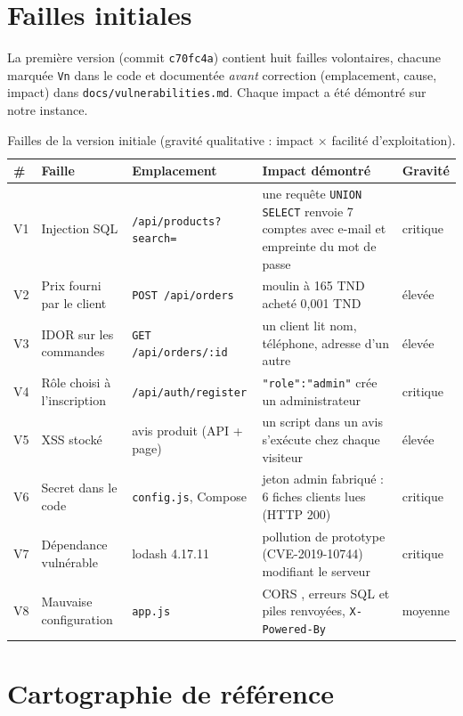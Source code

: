 \documentclass[11pt,a4paper]{article}
\newcommand{\code}[1]{\texttt{\small #1}}
\begin{document}
\section{Failles initiales}

La première version (commit \code{c70fc4a}) contient huit failles volontaires, chacune marquée \code{Vn}
dans le code et documentée \emph{avant} correction (emplacement, cause, impact) dans
\code{docs/vulnerabilities.md}. Chaque impact a été démontré sur notre instance.

\begin{table}[H]
\small
\begin{tabularx}{\linewidth}{@{}L{0.6cm}L{3.2cm}L{3.7cm}YL{1.3cm}@{}}
\toprule
\textbf{\#} & \textbf{Faille} & \textbf{Emplacement} & \textbf{Impact démontré} & \textbf{Gravité} \\
\midrule
V1 & Injection SQL & \code{/api/products?search=} & une requête \code{UNION SELECT} renvoie 7 comptes avec e-mail et empreinte du mot de passe & critique \\
V2 & Prix fourni par le client & \code{POST /api/orders} & moulin à 165 TND acheté 0,001 TND & élevée \\
V3 & IDOR sur les commandes & \code{GET /api/orders/:id} & un client lit nom, téléphone, adresse d'un autre & élevée \\
V4 & Rôle choisi à l'inscription & \code{/api/auth/register} & \code{"role":"admin"} crée un administrateur & critique \\
V5 & XSS stocké & avis produit (API + page) & un script dans un avis s'exécute chez chaque visiteur & élevée \\
V6 & Secret dans le code & \code{config.js}, Compose & jeton admin fabriqué : 6 fiches clients lues (HTTP 200) & critique \\
V7 & Dépendance vulnérable & lodash 4.17.11 & pollution de prototype (CVE-2019-10744) modifiant le serveur & critique \\
V8 & Mauvaise configuration & \code{app.js} & CORS \code{*}, erreurs SQL et piles renvoyées, \code{X-Powered-By} & moyenne \\
\bottomrule
\end{tabularx}
\caption{Failles de la version initiale (gravité qualitative : impact × facilité d'exploitation).}
\end{table}

\section{Cartographie de référence}
\end{document}
